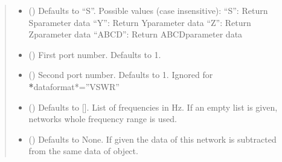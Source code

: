 \documentclass[letterpaper,10pt,english]{sphinxmanual}
\begin{document}
\begin{fulllineitems}
\begin{fulllineitems}
\begin{quote}
\begin{description}
\begin{itemize}
\sphinxhyphen{}   “MU2”: Output stability factor of 2\sphinxhyphen{}port
\sphinxhyphen{}   “VSWR”: VSWR ar port i
\sphinxhyphen{}   “MAG”: Magnitude of \(M_{i j}\)
\sphinxhyphen{}   “DB”: Magnitude of \(M_{i j}\) in dB
\sphinxhyphen{}   “REAL”: Real part of \(M_{i j}\)
\sphinxhyphen{}   “IMAG”: Imaginary part of \(M_{i j}\)
\sphinxhyphen{}   “PHASE”: Phase of \(M_{i j}\) in degrees between 0\sphinxhyphen{}360
\sphinxhyphen{}   “UNWRAPPEDPHASE”: Unwrapped Phase of \(M_{i j}\) in degrees
\sphinxhyphen{}   “GROUPDELAY”: Group Delay of \(M_{i j}\) in degrees

\item {} 
 (\sphinxstyleliteralemphasis{\sphinxupquote{, }}) \textendash{} Defaults to “S”. Possible values (case insensitive):
\sphinxhyphen{}   “S”: Return S\sphinxhyphen{}parameter data
\sphinxhyphen{}   “Y”: Return Y\sphinxhyphen{}parameter data
\sphinxhyphen{}   “Z”: Return Z\sphinxhyphen{}parameter data
\sphinxhyphen{}   “ABCD”: Return ABCD\sphinxhyphen{}parameter data

\item {} 
 (\sphinxstyleliteralemphasis{\sphinxupquote{, }}) \textendash{} First port number. Defaults to 1.

\item {} 
 (\sphinxstyleliteralemphasis{\sphinxupquote{, }}) \textendash{} Second port number. Defaults to 1. Ignored for {\color{red}\bfseries{}*}dataformat*=”VSWR”

\item {} 
 (\sphinxstyleliteralemphasis{\sphinxupquote{, }}) \textendash{} Defaults to {[}{]}. List of frequencies in Hz. If an empty list is given, networks whole frequency range is used.

\item {} 
 ({\hyperref[\detokenize{touchstone:touchstone.spfile}]{}}\sphinxstyleliteralemphasis{\sphinxupquote{, }}) \textendash{} Defaults to None. If given the data of this network is subtracted from the same data of  object.


\end{itemize}
\end{description}
\end{quote}
\end{fulllineitems}
\end{fulllineitems}
\end{document}
